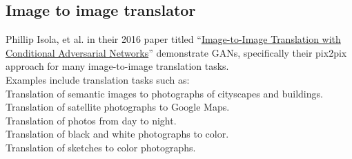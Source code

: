 \documentclass[14pt]{article}
\begin{document}
\subsection{Image to image translator}
Phillip Isola, et al. in their 2016 paper titled “\hyperlink{https://arxiv.org/abs/1611.07004}{Image-to-Image Translation with Conditional Adversarial Networks}” demonstrate GANs, specifically their pix2pix approach for many image-to-image translation tasks.
\\
Examples include translation tasks such as:\\
\hspace*{1cm}Translation of semantic images to photographs of cityscapes and buildings.
\\
\hspace*{1cm}Translation of satellite photographs to Google Maps.
\\
\hspace*{1cm}Translation of photos from day to night.\\
\hspace*{1cm}Translation of black and white photographs to color.\\
\hspace*{1cm}Translation of sketches to color photographs.\\
\end{document}
